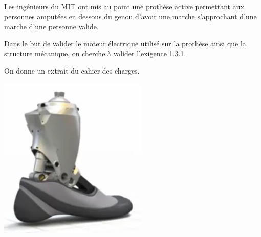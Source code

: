 \documentclass[10pt]{article}
\begin{document}
\begin{minipage}[c]{.8\linewidth}
Les ingénieurs du MIT ont mis au point une prothèse active permettant aux personnes amputées en dessous du genou d'avoir une marche s'approchant d'une marche d'une personne valide. 
\begin{obj} 
Dans le but de valider le moteur électrique utilisé sur la prothèse ainsi que la structure mécanique, on cherche à valider l'exigence 1.3.1.
\end{obj}

 On donne un extrait du cahier des charges.
 
\end{minipage} \hfill
\begin{minipage}[c]{.15\linewidth}
\begin{center}
\includegraphics[width=\textwidth]{images/prot_01}
\end{center}
\end{minipage}
\end{document}
